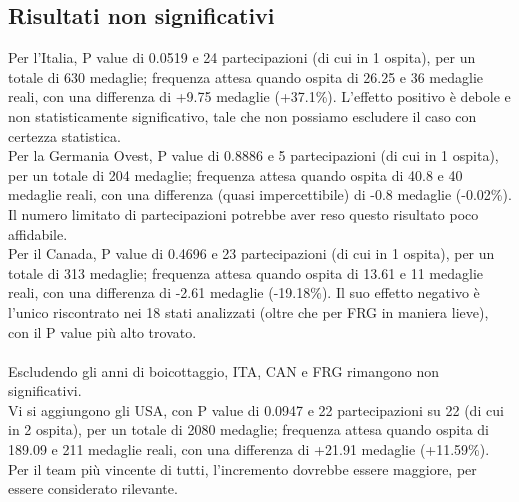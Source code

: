 \subsection{Risultati non significativi}


Per l'Italia, P value di 0.0519 e 24 partecipazioni (di cui in 1 ospita), per un
totale di 630 medaglie; frequenza attesa quando ospita di 26.25 e 36 medaglie
reali, con una differenza di +9.75 medaglie (+37.1\%). L'effetto positivo è
debole e non statisticamente significativo, tale che non possiamo escludere il
caso con certezza statistica.\\
Per la Germania Ovest, P value di 0.8886 e 5 partecipazioni (di cui in 1
ospita), per un totale di 204 medaglie; frequenza attesa quando ospita di 40.8 e
40 medaglie reali, con una differenza (quasi impercettibile) di -0.8 medaglie
(-0.02\%). Il numero limitato di partecipazioni potrebbe aver reso questo
risultato poco affidabile.\\
Per il Canada,  P value di 0.4696 e 23 partecipazioni (di cui in 1 ospita), per
un totale di 313 medaglie; frequenza attesa quando ospita di 13.61 e 11 medaglie
reali, con una differenza di -2.61 medaglie (-19.18\%). Il suo effetto negativo
è l'unico riscontrato nei 18 stati analizzati (oltre che per FRG in maniera
lieve), con il P value più alto trovato.\\
\\
Escludendo gli anni di boicottaggio, ITA, CAN e FRG rimangono non
significativi.\\
Vi si aggiungono gli USA, con P value di 0.0947 e 22 partecipazioni su 22 (di
cui in 2 ospita), per un totale di 2080 medaglie; frequenza attesa quando ospita
di 189.09 e 211 medaglie reali, con una differenza di +21.91 medaglie
(+11.59\%). Per il team più vincente di tutti, l'incremento dovrebbe essere
maggiore, per essere considerato rilevante.

